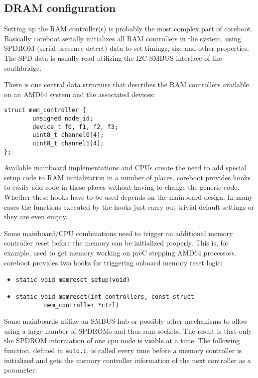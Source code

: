 \documentclass[titlepage,12pt]{article}
\begin{document}
\subsection{DRAM configuration}
Setting up the RAM controller(s) is probably the most complex part of
coreboot.  Basically coreboot serially initializes all RAM controllers
in the system, using SPDROM (serial presence detect) data to set
timings, size and other properties.  The SPD data is usually read
utilizing the I2C SMBUS interface of the southbridge.

There is one central data structure that describes the RAM controllers
available on an AMD64 system and the associated devices:

\begin{verbatim}
struct mem_controller {
        unsigned node_id;
        device_t f0, f1, f2, f3;
        uint8_t channel0[4];
        uint8_t channel1[4];
};
\end{verbatim}

Available mainboard implementations and CPUs create the need to add
special setup code to RAM initialization in a number of places.
coreboot provides hooks to easily add code in these places without
having to change the generic code.  Whether these hooks have to be used
depends on the mainboard design. In many cases the functions executed
by the hooks just carry out trivial default settings or they are even
empty.

Some mainboard/CPU combinations need to trigger an additional memory
controller reset before the memory can be initialized properly. This is,
for example, used to get memory working on preC stepping AMD64
processors. coreboot provides two hooks for triggering onboard memory
reset logic:

\begin{itemize}
\item \begin{verbatim}static void memreset_setup(void)\end{verbatim}
\item \begin{verbatim}static void memreset(int controllers, const struct
		mem_controller *ctrl)\end{verbatim}
\end{itemize}

Some mainboards utilize an SMBUS hub or possibly other mechanisms to
allow using a large number of SPDROMs and thus ram sockets. The result
is that only the SPDROM information of one cpu node is visible at a
time. The following function, defined in \texttt{auto.c}, is called every time
before a memory controller is initialized and gets the memory controller
information of the next controller as a parameter:
\end{document}
